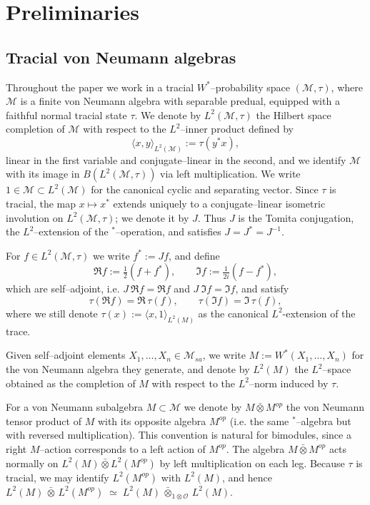 \documentclass[10pt,a4paper,reqno]{amsart}
\begin{document}
\section{Preliminaries}
\subsection{Tracial von Neumann algebras}
Throughout the paper we work in a tracial $W^\ast$--probability space
$(\mathcal{M},\tau)$, where $\mathcal{M}$ is a finite von Neumann algebra with separable predual, equipped with a faithful normal tracial state $\tau$.  We denote by $L^2(\mathcal{M},\tau)$ the Hilbert space completion of $\mathcal{M}$ with respect to the $L^2$--inner product defined by
\[
\langle x, y\rangle_{L^2(\mathcal{M})} := \tau(y^\ast x),
\]
linear in the first variable and conjugate--linear in the second, and we identify $\mathcal{M}$ with its image in $B(L^2(\mathcal{M},\tau))$ via left multiplication. We write $1 \in \mathcal{M} \subset L^2(\mathcal{M})$ for the canonical cyclic and separating vector. Since $\tau$ is tracial, the map $x\mapsto x^\ast$ extends uniquely to a conjugate--linear isometric involution on $L^2(\mathcal{M},\tau)$; we denote it by $J$.  Thus $J$ is the Tomita conjugation, the $L^2$--extension of the $^\ast$--operation, and satisfies $J = J^\ast = J^{-1}$.  

For $f\in L^2(\mathcal{M},\tau)$ we write $f^\ast := Jf$, and define
\[
\Re f := \tfrac12(f+f^\ast), \qquad
\Im f := \tfrac{1}{2i}(f-f^\ast),
\]
which are self--adjoint, i.e. $J\:\Re f=\Re f$ and $J\:\Im f=\Im f$, and satisfy
\[
\tau(\Re f)=\Re\,\tau(f), \qquad \tau(\Im f)=\Im\,\tau(f),
\]
where we still denote $\tau(x):=\langle x,1\rangle_{L^2(M)}$ as the canonical $L^2$-extension of the trace.

\medskip

Given self--adjoint elements $X_1,\ldots,X_n\in\mathcal{M}_{sa}$, we write $
M := W^\ast(X_1,\ldots,X_n)
$ for the von Neumann algebra they generate, and denote by $L^2(M)$ the
$L^2$--space obtained as the completion of $M$ with respect to the
$L^2$--norm induced by $\tau$.


\medskip

For a von Neumann subalgebra $M\subset\mathcal{M}$ we denote by
$M\bar\otimes M^{op}$ the von Neumann tensor product of $M$ with its opposite
algebra $M^{op}$ (i.e. the same $^\ast$--algebra but with reversed multiplication).  This
convention is natural for bimodules, since a right $M$--action corresponds to a
left action of $M^{op}$.  The algebra $M\bar\otimes M^{op}$ acts normally on
$L^2(M)\bar\otimes L^2(M^{op})$ by left multiplication on each leg.  Because
$\tau$ is tracial, we may identify $L^2(M^{op})$ with $L^2(M)$, and hence $
L^2(M)\,\bar\otimes\,L^2(M^{op})
\;\simeq\;
L^2(M)\,\bar\otimes_{1\otimes\mathcal{O}}\,L^2(M)$.
\end{document}
